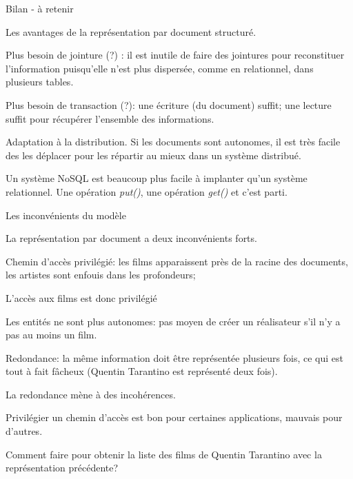 \begin{frame}[fragile]{Bilan - à retenir}

Les avantages de la représentation par document structuré.

\begin{redbullet}

  \item \alert{Plus besoin de jointure (?)} : il est inutile de faire des jointures pour reconstituer
    l'information puisqu'elle n'est plus dispersée, comme en relationnel, dans plusieurs
    tables.
   
   \item \alert{Plus besoin de transaction (?)}: une écriture (du document) suffit; 
    une lecture suffit pour récupérer l'ensemble des informations.
    
  \item \alert{Adaptation à la distribution}. Si les documents sont autonomes, il est très facile
    des les déplacer pour les répartir au mieux dans un système distribué.
\end{redbullet}

\vfill

Un système NoSQL est beaucoup plus facile à implanter qu'un système relationnel. Une
opération \textit{put()}, une opération \textit{get()} et c'est parti.

\end{frame}


\begin{frame}[fragile]{Les inconvénients du modèle}

La représentation par document a deux inconvénients forts. 

\begin{redbullet}
  \item \alert{Chemin d'accès privilégié}: les   films apparaissent près de la racine des documents, les artistes 
    sont enfouis dans les profondeurs;
    
     L'accès aux films est donc privilégié

 \item \alert{Les entités ne sont plus autonomes}: 
   pas moyen de créer un réalisateur s'il n'y a pas au moins un film.

    
  \item \alert{Redondance}: la même information doit être représentée
    plusieurs fois, ce qui est tout à fait fâcheux (Quentin Tarantino est représenté deux fois).
 \end{redbullet}
 
\vfill

La redondance mène à des incohérences.

\vfill

Privilégier un chemin d'accès est bon pour certaines applications, mauvais pour d'autres.

\vfill

Comment faire pour obtenir la liste des films de Quentin Tarantino avec
la représentation précédente?
\end{frame}

